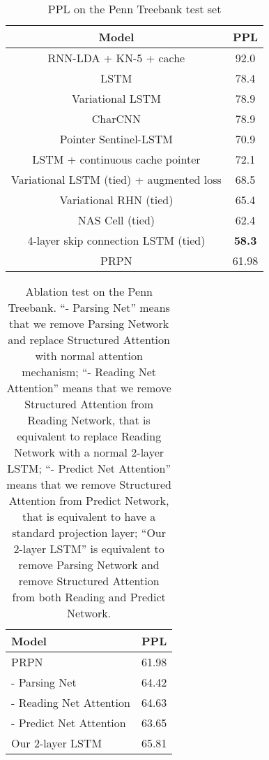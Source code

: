 \documentclass{article} \usepackage{iclr2018_conference,times}
\begin{document}
\begin{table}[h]  
\centering  
  \begin{tabular}{ c c }
    \toprule[2pt]
    Model & PPL \\
    \hline
    RNN-LDA + KN-5 + cache \citep{mikolov2012context} &  92.0 \\
    LSTM \citep{zaremba2014recurrent} & 78.4 \\
    Variational LSTM \citep{kim2016character} & 78.9 \\
    CharCNN \citep{kim2016character} & 78.9 \\
    Pointer Sentinel-LSTM \citep{merity2016pointer} & 70.9 \\
    LSTM + continuous cache pointer \citep{grave2016improving} & 72.1 \\
    Variational LSTM (tied) + augmented loss \citep{inan2016tying} & 68.5 \\
    Variational RHN (tied) \citep{zilly2016recurrent} & 65.4 \\
    NAS Cell (tied)  \citep{zoph2016neural} & 62.4 \\
    4-layer skip connection LSTM (tied) \citep{melis2017state} & \textbf{58.3} \\
\hline
    PRPN & 61.98 \\
    \toprule[2pt]
  \end{tabular}
  \caption{PPL on the Penn Treebank test set}
  \label{tab_ptb_word}
\end{table}

\begin{table}[h]  
\centering  
  \begin{tabular}{ l c }
    \toprule[2pt]
    Model & PPL \\
    \hline
    PRPN & 61.98 \\
     - Parsing Net & 64.42 \\
     - Reading Net Attention & 64.63 \\
     - Predict Net Attention & 63.65 \\
    Our 2-layer LSTM & 65.81 \\
    \toprule[2pt]
  \end{tabular}
  \caption{Ablation test on the Penn Treebank. ``- Parsing Net'' means that we remove Parsing Network and replace Structured Attention with normal attention mechanism; ``- Reading Net Attention'' means that we remove Structured Attention from Reading Network, that is equivalent to replace Reading Network with a normal 2-layer LSTM; ``- Predict Net Attention'' means that we remove Structured Attention from Predict Network, that is equivalent to have a standard projection layer; ``Our 2-layer LSTM'' is equivalent to remove Parsing Network and remove Structured Attention from both Reading and Predict Network.}
  \label{tab_ablation}
\end{table}
\end{document}

